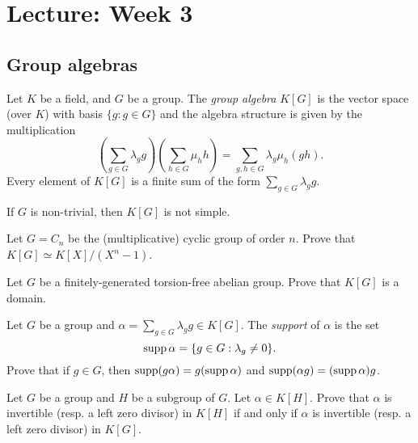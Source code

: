 \section{Lecture: Week 3}
\label{03}

\subsection{Group algebras}

Let $K$ be a field, and $G$ be a group. The \emph{group algebra} $K[G]$ 
is the vector space (over $K$) with basis $\{g:g\in G\}$ 
and the algebra structure is given by the multiplication
\[
	\left(\sum_{g\in G}\lambda_gg\right)\left(\sum_{h\in G}\mu_hh\right)
	=\sum_{g,h\in G}\lambda_g\mu_h(gh).
\]
Every element of $K[G]$ is a finite sum of the form $\sum_{g\in G}\lambda_gg$.

\begin{exercise}
\label{xc:K[G]notsimple}
    If $G$ is non-trivial, then $K[G]$ is not simple. 
\end{exercise}

\begin{exercise}
\label{xca:K_cyclic}
	Let $G=C_n$ be the (multiplicative) cyclic group of order $n$. Prove that 
	$K[G]\simeq K[X]/(X^n-1)$. 
\end{exercise}

\begin{exercise}
\label{xca:abelian=>domain}
	Let $G$ be a finitely-generated torsion-free abelian group. Prove that 
	$K[G]$ is a domain. 
\end{exercise}



\begin{exercise}
	Let $G$ be a group and $\alpha=\sum_{g\in G}\lambda_gg\in K[G]$.  
	The \emph{support} of $\alpha$ is the set 
	\[
		\operatorname{supp}\alpha=\{g\in G:\lambda_g\ne 0\}.
	\]
	Prove that if $g\in G$, then 
	$\operatorname{supp}(g\alpha)=g(\operatorname{supp}\alpha)$ and $\operatorname{supp}(\alpha g)=(\operatorname{supp}\alpha)g$.
\end{exercise}

\begin{exercise}
\label{xca:invertible_subgroups}
	Let $G$ be a group and $H$ be a subgroup of $G$. Let $\alpha\in K[H]$. Prove that 
    $\alpha$ is invertible (resp. a left zero divisor) in $K[H]$ if and only if 
	$\alpha$ is invertible (resp. a left zero divisor) in
	$K[G]$.
\end{exercise}


